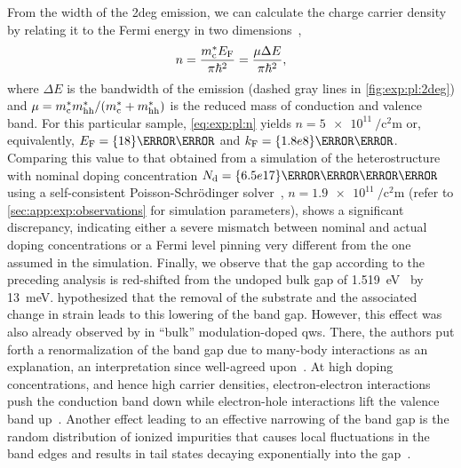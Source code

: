 From the width of the \gls{2deg} emission, we can calculate the charge carrier density by relating it to the Fermi energy in two dimensions~\cite{Pinczuk1984,Ihn2009},
\begin{equation}\label{eq:exp:pl:n}
    n = \frac{m^{\ast}_{\mathrm{c}}E_{\mathrm{F}}}{\pi\hbar^2} = \frac{\mu\Delta E}{\pi\hbar^2},
\end{equation}
where $\Delta E$ is the bandwidth of the emission (dashed gray lines in \cref{fig:exp:pl:2deg}) and $\mu = m^{\ast}_{\mathrm{c}}m^{\ast}_{\mathrm{hh}}/(m^{\ast}_{\mathrm{c}} + m^{\ast}_{\mathrm{hh}})$ is the reduced mass of conduction and valence band.
For this particular sample, \cref{eq:exp:pl:n} yields $n = \qty{5e11}{\per\square\centi\meter}$ or, equivalently, $E_{\mr{F}} = \qty{18}{\milli\electronvolt}$ and $k_{\mr{F}} = \qty{1.8e8}{\per\meter}$.
Comparing this value to that obtained from a simulation of the heterostructure with nominal doping concentration $N_{\mr{d}} = \qty{6.5e17}{\per\cubic\centi\meter}$ using a self-consistent Poisson-Schrödinger solver~\cite{PoissonSchroedinger}, $n = \qty{1.9e11}{\per\square\centi\meter}$ (refer to \cref{sec:app:exp:observations} for simulation parameters), shows a significant discrepancy, indicating either a severe mismatch between nominal and actual doping concentrations or a Fermi level pinning very different from the one assumed in the simulation.
Finally, we observe that the gap according to the preceding analysis is red-shifted from the undoped bulk gap of \qty{1.519}{\electronvolt}~\cite{Vurgaftman2001} by \qty{13}{\milli\electronvolt}.
 hypothesized that the removal of the  substrate and the associated change in strain leads to this lowering of the band gap.
However, this effect was also already observed by \citet{Pinczuk1984} in \enquote{bulk} modulation-doped  \glspl{qw}.
There, the authors put forth a renormalization of the band gap due to many-body interactions as an explanation, an interpretation since well-agreed upon~\cite{Jain1992}.
At high doping concentrations, and hence high carrier densities, electron-electron interactions push the conduction band down while electron-hole interactions lift the valence band up~\cite{Jain1987}.
Another effect leading to an effective narrowing of the band gap is the random distribution of ionized impurities that causes local fluctuations in the band edges and results in tail states decaying exponentially into the gap~\cite{Jain1987}.

